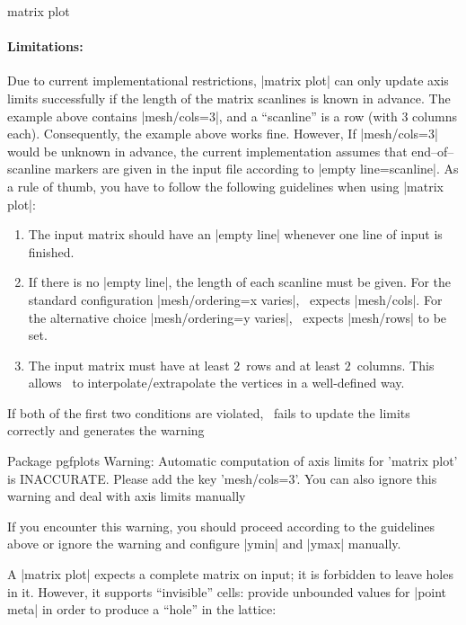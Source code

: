 {\begin{plottype}[/pgfplots]{matrix plot}
	\paragraph{Limitations: } Due to current implementational restrictions, |matrix plot| can only update axis limits successfully if the length of the matrix scanlines is known in advance. The example above contains |mesh/cols=3|, and a ``scanline'' is a row (with $3$ columns each). Consequently, the example above works fine. However, If |mesh/cols=3| would be unknown in advance, the current implementation assumes that end--of--scanline markers are given in the input file according to |empty line=scanline|. As a rule of thumb, you have to follow the following guidelines when using |matrix plot|:
	\begin{enumerate}
		\item The input matrix should have an |empty line| whenever one line of input is finished.
		\item If there is no |empty line|, the length of each scanline must be given. For the standard configuration |mesh/ordering=x varies|, \PGFPlots\ expects |mesh/cols|. For the alternative choice |mesh/ordering=y varies|, \PGFPlots\ expects |mesh/rows| to be set.
		\item The input matrix must have at least $2$~rows and at least $2$~columns. This allows \PGFPlots\ to interpolate/extrapolate the vertices in a well-defined way.
	\end{enumerate}
	If both of the first two conditions are violated, \PGFPlots\ fails to update the limits correctly and generates the warning 
\begin{codeexample}
Package pgfplots Warning: Automatic computation of axis limits for 'matrix plot' is INACCURATE. 
Please add the key 'mesh/cols=3'. You can also ignore this warning and deal with axis limits manually
\end{codeexample}
If you encounter this warning, you should proceed according to the guidelines above or ignore the warning and configure |ymin| and |ymax| manually.

	A |matrix plot| expects a complete matrix on input; it is forbidden to leave holes in it. However, it supports ``invisible'' cells: provide unbounded values for |point meta| in order to produce a ``hole'' in the lattice:
\begin{codeexample}[]
\begin{tikzpicture}
	\begin{axis}[enlargelimits=false,colorbar]


\end{axis}
\end{tikzpicture}
\end{codeexample}
\end{plottype}}
